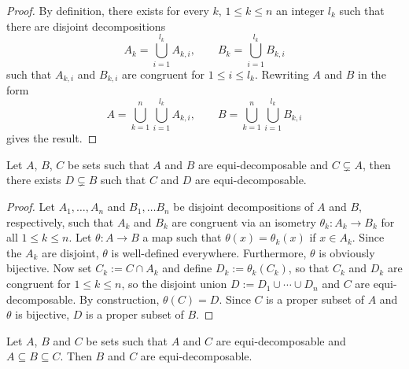 \documentclass[12pt]{article}
\newcommand{\Bigcup}{\bigcup\limits}
\begin{document}
\begin{proof}
By definition, there exists for every $k$, $1\leq k\leq n$ an integer
$l_k$ such that there are disjoint decompositions
\begin{equation*}
A_k=\Bigcup_{i=1}^{l_k}A_{k,i},\qquad B_k=\Bigcup_{i=1}^{l_k}B_{k,i}
\end{equation*}
such that $A_{k,i}$ and $B_{k,i}$ are congruent for $1\leq i\leq
l_k$. Rewriting $A$ and $B$ in the form
\begin{equation*}
A=\Bigcup_{k=1}^n\Bigcup_{i=1}^{l_k}A_{k,i},\qquad B=\Bigcup_{k=1}^n\Bigcup_{i=1}^{l_k}B_{k,i}
\end{equation*}
gives the result.
\end{proof}
\medskip

\begin{thm}
\label{cor7}
Let $A$, $B$, $C$ be sets such that $A$ and $B$ are equi-decomposable
and $C\subsetneq A$, then there exists $D\subsetneq B$ such that $C$
and $D$ are equi-decomposable.
\end{thm}
\smallskip

\begin{proof}
Let $A_1,\ldots,A_n$ and $B_1,\ldots B_n$ be disjoint decompositions of
$A$ and $B$, respectively, such that $A_k$ and $B_k$ are congruent via
an isometry $\theta_k\colon A_k\to B_k$ for all $1\leq k\leq n$. Let
$\theta\colon A\to B$ a map such that $\theta(x)=\theta_k(x)$ if $x\in
A_k$. Since the $A_k$ are disjoint, $\theta$ is well-defined
everywhere. Furthermore, $\theta$ is obviously bijective. Now set
$C_k:=C\cap A_k$ and define $D_k:=\theta_k(C_k)$, so that $C_k$ and
$D_k$ are congruent for $1\leq k\leq n$, so the disjoint union
$D:=D_1\cup\cdots\cup D_n$ and $C$ are equi-decomposable. By
construction, $\theta(C)=D$. Since $C$ is a proper subset of $A$ and
$\theta$ is bijective, $D$ is a proper subset of $B$.
\end{proof}
\medskip

\begin{thm}
\label{cor9}
Let $A$, $B$ and $C$ be sets such that $A$ and $C$ are
equi-decomposable and $A\subseteq B\subseteq C$. Then $B$ and $C$ are
equi-decomposable.
\end{thm}
\smallskip
\end{document}
